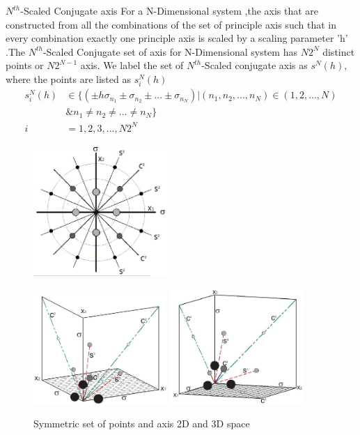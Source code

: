 \documentclass{beamer}
\begin{document}
\begin{frame}
\begin{block}{$N^{th}$-Scaled Conjugate axis}
For a N-Dimensional system ,the axis that are constructed from all the combinations of the set of principle axis such that in every combination exactly one principle axis is scaled by a scaling parameter 'h' .The $N^{th}$-Scaled Conjugate set of axis for N-Dimensional system has $N2^N$ distinct points or $N2^{N-1}$ axis. We label the set of $N^{th}$-Scaled conjugate axis as $s^N(h)$, where the points are listed as $s^N_i(h)$ 
\begin{align}
s^N_i(h) &\in \{(\pm h\sigma_{n_1}\pm\sigma_{n_2} \pm ...\pm \sigma_{n_N})|(n_1,n_2,...,n_N)\in (1,2,...,N) \\
&\& n_1\ne n_2\ne...\ne n_N \}\\
i&=1,2,3,...,N2^N 
\end{align}
\end{block}
\end{frame}
\begin{frame}
\begin{figure}[thpb]
      \centering
     \includegraphics[width=2in]{2Dallaxis}\label{fig:allaxissubfig1}
      \end{figure}
  \begin{figure}[thpb]
  \includegraphics[width=2in]{3d1corellabel}\label{fig:allaxissubfig2}
     \includegraphics[width=2in]{3d2corellabel}\label{fig:allaxissubfig3}
      \caption{Symmetric set of points and axis 2D and 3D space}
      \label{fig:allaxissubfig123}
   \end{figure}
   \end{frame}
\end{document}
